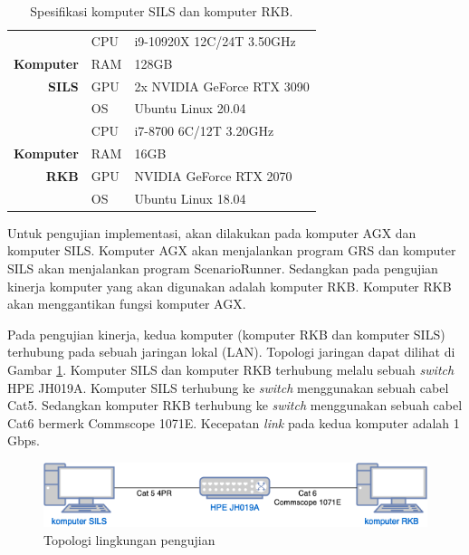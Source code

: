 \begin{table}[!htbp]
	\centering
	\begin{tabular}{|r|l|l|}
		\hline
		                  & CPU & i9-10920X 12C/24T 3.50GHz  \\
		\cline{2-3}
		\textbf{Komputer} & RAM & 128GB                      \\
		\cline{2-3}
		\textbf{SILS}     & GPU & 2x NVIDIA GeForce RTX 3090 \\
		\cline{2-3}
		                  & OS  & Ubuntu Linux 20.04         \\
		\hline
		                  & CPU & i7-8700 6C/12T 3.20GHz     \\
		\cline{2-3}
		\textbf{Komputer} & RAM & 16GB                       \\
		\cline{2-3}
		\textbf{RKB}      & GPU & NVIDIA GeForce RTX 2070    \\
		\cline{2-3}
		                  & OS  & Ubuntu Linux 18.04         \\
		\hline
	\end{tabular}
	\caption{Spesifikasi komputer SILS dan komputer RKB.}
	\label{chapter-4-tbl-environment-specs}
\end{table}

Untuk pengujian implementasi, akan dilakukan pada komputer AGX dan komputer
SILS. Komputer AGX akan menjalankan program GRS dan komputer SILS akan
menjalankan program ScenarioRunner. Sedangkan pada pengujian kinerja komputer
yang akan digunakan adalah komputer RKB. Komputer RKB akan menggantikan fungsi
komputer AGX.

Pada pengujian kinerja, kedua komputer (komputer RKB dan komputer SILS)
terhubung pada sebuah jaringan lokal (LAN). Topologi jaringan dapat dilihat di
Gambar \ref{chapter-4-fig-topology}. Komputer SILS dan komputer RKB terhubung
melalu sebuah \textit{switch} HPE JH019A. Komputer SILS terhubung ke
\textit{switch} menggunakan sebuah cabel Cat5. Sedangkan komputer RKB terhubung
ke \textit{switch} menggunakan sebuah cabel Cat6 bermerk Commscope 1071E.
Kecepatan \textit{link} pada kedua komputer adalah 1 Gbps.

\begin{figure}[!htbp]
	\centering
	\includegraphics[width=1.0\textwidth]{resources/chapter-4/test-environment-network-topology.png}
	\caption{Topologi lingkungan pengujian}
	\label{chapter-4-fig-topology}
\end{figure}

